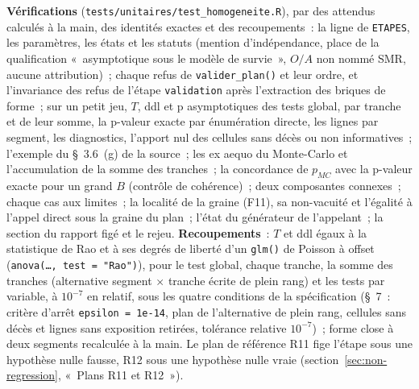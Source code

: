 \documentclass[a4paper,11pt]{article}
\newcommand{\code}[1]{\texttt{\small #1}}
\begin{document}
\medskip
\noindent
\textbf{Vérifications} (\code{tests/unitaires/test\_homogeneite.R}), par
des attendus calculés à la main, des identités exactes et des
recoupements~: la ligne de \code{ETAPES}, les paramètres, les états et les
statuts (mention d'indépendance, place de la qualification «~asymptotique
sous le modèle de survie~», $O/A$ non nommé SMR, aucune attribution)~;
chaque refus de \code{valider\_plan()} et leur ordre, et l'invariance des
refus de l'étape \code{validation} après l'extraction des briques de
forme~; sur un petit jeu, $T$, ddl et p asymptotiques des tests global,
par tranche et de leur somme, la p-valeur exacte par énumération directe,
les lignes par segment, les diagnostics, l'apport nul des cellules sans
décès ou non informatives~; l'exemple du §~3.6~(g) de la source~; les ex
aequo du Monte-Carlo et l'accumulation de la somme des tranches~; la
concordance de $p_{MC}$ avec la p-valeur exacte pour un grand $B$ (contrôle
de cohérence)~; deux composantes connexes~; chaque cas aux limites~; la
localité de la graine (F11), sa non-vacuité et l'égalité à l'appel direct
sous la graine du plan~; l'état du générateur de l'appelant~; la section
du rapport figé et le rejeu. \textbf{Recoupements}~: $T$ et ddl égaux à la
statistique de Rao et à ses degrés de liberté d'un \code{glm()} de Poisson
à offset (\code{anova(\ldots, test = "Rao")}), pour le test global, chaque
tranche, la somme des tranches (alternative segment $\times$ tranche écrite
de plein rang) et les tests par variable, à $10^{-7}$ en relatif, sous les
quatre conditions de la spécification (§~7~: critère d'arrêt
\code{epsilon = 1e-14}, plan de l'alternative de plein rang, cellules sans
décès et lignes sans exposition retirées, tolérance relative
$10^{-7}$)~; forme close à deux segments recalculée à la main. Le plan de
référence R11 fige l'étape sous une hypothèse nulle fausse, R12 sous une
hypothèse nulle vraie (section~\ref{sec:non-regression}, «~Plans R11 et
R12~»).
\end{document}
